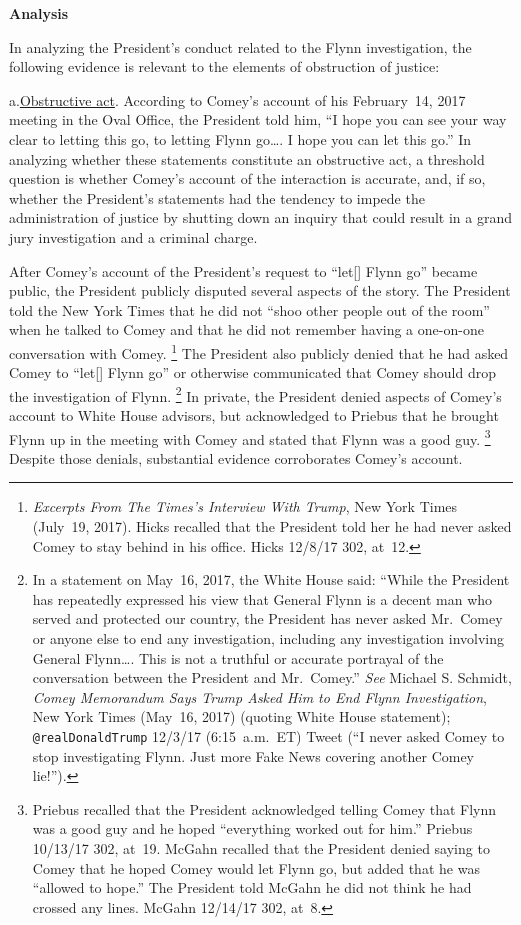 \begin{center}
\textbf{Analysis}
\end{center}

In analyzing the President's conduct related to the Flynn investigation, the following evidence is relevant to the elements of obstruction of justice:

a.\qquad\underline{Obstructive act}.
According to Comey's account of his February~14, 2017 meeting in the Oval Office, the President told him, ``I hope you can see your way clear to letting this go, to letting Flynn go\dots. I hope you can let this go.''
In analyzing whether these statements constitute an obstructive act, a threshold question is whether Comey's account of the interaction is accurate, and, if so, whether the President's statements had the tendency to impede the administration of
justice by shutting down an inquiry that could result in a grand jury investigation and a criminal charge.

After Comey's account of the President's request to ``let[] Flynn go'' became public, the President publicly disputed several aspects of the story.
The President told the New York Times that he did not ``shoo other people out of the room'' when he talked to Comey and that he did not remember having a one-on-one conversation with Comey.%
\footnote{\textit{Excerpts From The Times's Interview With Trump}, New York Times (July~19, 2017).
Hicks recalled that the President told her he had never asked Comey to stay behind in his office.
Hicks 12/8/17 302, at~12.}
The President also publicly denied that he had asked Comey to ``let[] Flynn go'' or otherwise communicated that Comey should drop the investigation of Flynn.%
\footnote{In a statement on May~16, 2017, the White House said:
``While the President has repeatedly expressed his view that General Flynn is a decent man who served and protected our country, the President has never asked Mr.~Comey or anyone else to end any investigation, including any investigation involving General Flynn\dots.
This is not a truthful or accurate portrayal of the conversation between the President and Mr.~Comey.''
\textit{See} Michael S. Schmidt, \textit{Comey Memorandum Says Trump Asked Him to End Flynn Investigation}, New York Times (May~16, 2017) (quoting White House statement);
\verb+@realDonaldTrump+ 12/3/17 (6:15~a.m.~ET) Tweet (``I never asked Comey to stop investigating Flynn.
Just more Fake News covering another Comey lie!'').}
In private, the President denied aspects of Comey's account to White House advisors, but acknowledged to Priebus that he brought Flynn up in the meeting with Comey and stated that Flynn was a good guy.%
\footnote{Priebus recalled that the President acknowledged telling Comey that Flynn was a good guy and he hoped ``everything worked out for him.''
Priebus 10/13/17 302, at~19.
McGahn recalled that the President denied saying to Comey that he hoped Comey would let Flynn go, but added that he was ``allowed to hope.''
The President told McGahn he did not think he had crossed any lines.
McGahn 12/14/17 302, at~8.}
Despite those denials, substantial evidence corroborates Comey's account.

